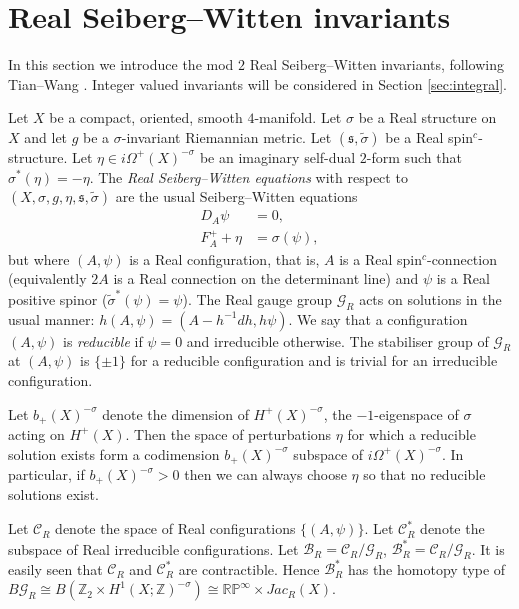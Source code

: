 \documentclass{amsart}
\theoremstyle{definition}
\theoremstyle{remark}
\numberwithin{equation}{section}
\begin{document}
\section{Real Seiberg--Witten invariants}\label{sec:realswi}

In this section we introduce the mod $2$ Real Seiberg--Witten invariants, following Tian--Wang \cite{tw}. Integer valued invariants will be considered in Section \ref{sec:integral}.

Let $X$ be a compact, oriented, smooth $4$-manifold. Let $\sigma$ be a Real structure on $X$ and let $g$ be a $\sigma$-invariant Riemannian metric. Let $(\mathfrak{s} , \widetilde{\sigma})$ be a Real spin$^c$-structure. Let $\eta \in i \Omega^+(X)^{-\sigma}$ be an imaginary self-dual $2$-form such that $\sigma^*(\eta) = -\eta$. The {\em Real Seiberg--Witten equations} with respect to $(X , \sigma , g , \eta , \mathfrak{s} , \widetilde{\sigma})$ are the usual Seiberg--Witten equations
\begin{align*}
D_A \psi &= 0, \\
F^+_A + \eta &= \sigma(\psi),
\end{align*}
but where $(A , \psi)$ is a Real configuration, that is, $A$ is a Real spin$^c$-connection (equivalently $2A$ is a Real connection on the determinant line) and $\psi$ is a Real positive spinor ($\widetilde{\sigma}^*(\psi) = \psi$). The Real gauge group $\mathcal{G}_R$ acts on solutions in the usual manner: $h(A , \psi ) = ( A - h^{-1}dh , h \psi)$. We say that a configuration $(A , \psi)$ is {\em reducible} if $\psi = 0$ and {\rm irreducible} otherwise. The stabiliser group of $\mathcal{G}_R$ at $(A , \psi)$ is $\{ \pm 1\}$ for a reducible configuration and is trivial for an irreducible configuration.

Let $b_+(X)^{-\sigma}$ denote the dimension of $H^+(X)^{-\sigma}$, the $-1$-eigenspace of $\sigma$ acting on $H^+(X)$. Then the space of perturbations $\eta$ for which a reducible solution exists form a codimension $b_+(X)^{-\sigma}$ subspace of $i \Omega^+(X)^{-\sigma}$. In particular, if $b_+(X)^{-\sigma} > 0$ then we can always choose $\eta$ so that no reducible solutions exist.

Let $\mathcal{C}_R$ denote the space of Real configurations $\{ (A,\psi) \}$. Let $\mathcal{C}^*_R$ denote the subspace of Real irreducible configurations. Let $\mathcal{B}_R = \mathcal{C}_R/\mathcal{G}_R$, $\mathcal{B}^*_R = \mathcal{C}_R/\mathcal{G}_R$. It is easily seen that $\mathcal{C}_R$ and $\mathcal{C}^*_R$ are contractible. Hence $\mathcal{B}^*_R$ has the homotopy type of $B\mathcal{G}_R \cong B( \mathbb{Z}_2 \times H^1(X ; \mathbb{Z})^{-\sigma} ) \cong \mathbb{RP}^\infty \times Jac_R(X)$.
\end{document}
